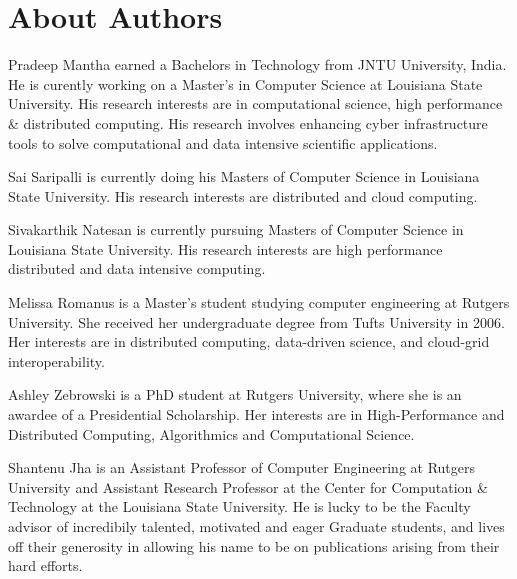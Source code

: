 \documentclass[]{paper}
\begin{document}
\section{About Authors} 

Pradeep Mantha earned a Bachelors in Technology from JNTU University, India. He is curently working on a Master's in Computer Science at
Louisiana State University. His research interests are in computational science, high performance \& distributed computing. His research involves enhancing
cyber infrastructure tools to solve computational and data intensive scientific applications.

Sai Saripalli is currently doing his Masters of Computer Science in Louisiana State University. His research interests are distributed and cloud computing. 

Sivakarthik Natesan is currently pursuing Masters of Computer Science in Louisiana State University. His research interests are high performance distributed and data intensive computing.

Melissa Romanus is a Master's student studying computer engineering at Rutgers University. She received her undergraduate degree from Tufts University in 2006. Her interests are in distributed computing, data-driven science, and cloud-grid interoperability.

Ashley Zebrowski is a PhD student at Rutgers University, where she is an awardee of a Presidential Scholarship. Her interests are in High-Performance and Distributed Computing, Algorithmics and Computational Science.

Shantenu Jha is an Assistant Professor of Computer Engineering at Rutgers University and Assistant Research Professor at the Center for Computation \& Technology at the Louisiana State University. He is lucky to be the Faculty advisor of incredibily talented, motivated and eager Graduate students, and lives off their generosity in allowing his name to be on publications arising from their hard efforts.





\end{document}
